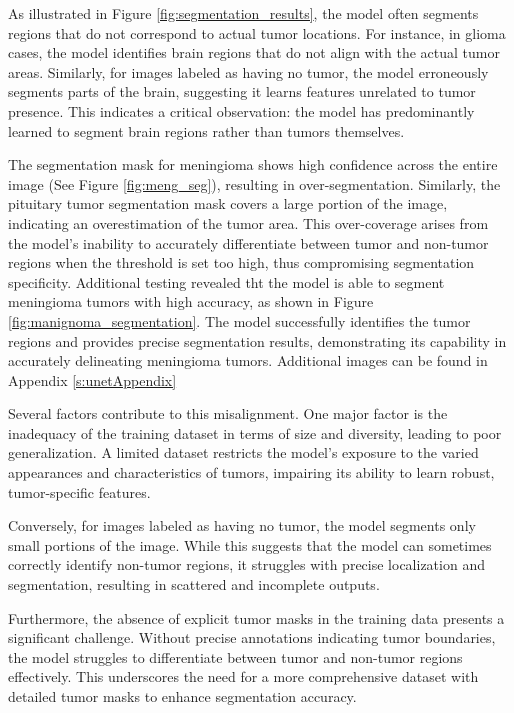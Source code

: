 As illustrated in Figure \ref{fig:segmentation_results}, the model often segments regions that do not correspond to actual tumor locations. For instance, in glioma cases, the model identifies brain regions that do not align with the actual tumor areas. Similarly, for images labeled as having no tumor, the model erroneously segments parts of the brain, suggesting it learns features unrelated to tumor presence. This indicates a critical observation: the model has predominantly learned to segment brain regions rather than tumors themselves.

The segmentation mask for meningioma shows high confidence across the entire image (See Figure \ref{fig:meng_seg}), resulting in over-segmentation. Similarly, the pituitary tumor segmentation mask covers a large portion of the image, indicating an overestimation of the tumor area. This over-coverage arises from the model's inability to accurately differentiate between tumor and non-tumor regions when the threshold is set too high, thus compromising segmentation specificity. Additional testing revealed tht the model is able to segment meningioma tumors with high accuracy, as shown in Figure \ref{fig:manignoma_segmentation}. The model successfully identifies the tumor regions and provides precise segmentation results, demonstrating its capability in accurately delineating meningioma tumors. Additional images can be found in Appendix \ref{s:unetAppendix}

Several factors contribute to this misalignment. One major factor is the inadequacy of the training dataset in terms of size and diversity, leading to poor generalization. A limited dataset restricts the model's exposure to the varied appearances and characteristics of tumors, impairing its ability to learn robust, tumor-specific features. 

Conversely, for images labeled as having no tumor, the model segments only small portions of the image. While this suggests that the model can sometimes correctly identify non-tumor regions, it struggles with precise localization and segmentation, resulting in scattered and incomplete outputs.

Furthermore, the absence of explicit tumor masks in the training data presents a significant challenge. Without precise annotations indicating tumor boundaries, the model struggles to differentiate between tumor and non-tumor regions effectively. This underscores the need for a more comprehensive dataset with detailed tumor masks to enhance segmentation accuracy.

